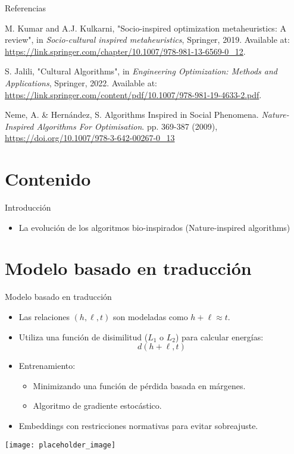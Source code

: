 \documentclass{beamer}
\begin{document}
\begin{frame}{Referencias}
\begin{thebibliography}{30}

M. Kumar and A.J. Kulkarni,
"Socio-inspired optimization metaheuristics: A review",
in \textit{Socio-cultural inspired metaheuristics}, Springer, 2019.
Available at: \url{https://link.springer.com/chapter/10.1007/978-981-13-6569-0_12}.

S. Jalili,
"Cultural Algorithms",
in \textit{Engineering Optimization: Methods and Applications}, Springer, 2022.
Available at: \url{https://link.springer.com/content/pdf/10.1007/978-981-19-4633-2.pdf}.

Neme, A. \& Hernández, S. Algorithms Inspired in Social Phenomena. {\em Nature-Inspired Algorithms For Optimisation}. pp. 369-387 (2009),  \url{https://doi.org/10.1007/978-3-642-00267-0_13}

\end{thebibliography}
\end{frame}


\section{Contenido}
\begin{frame}{Introducción}
    \begin{itemize}
        \item La evolución de los algoritmos bio-inspirados (Nature-inspired algorithms)
    \end{itemize}
\end{frame}


\section{Modelo basado en traducción}

\begin{frame}{Modelo basado en traducción}
    \begin{itemize}
        \item Las relaciones $(h, \ell, t)$ son modeladas como $h + \ell \approx t$.
        \item Utiliza una función de disimilitud ($L_1$ o $L_2$) para calcular energías:
        \[
        d(h + \ell, t)
        \]
        \item Entrenamiento:
        \begin{itemize}
            \item Minimizando una función de pérdida basada en márgenes.
            \item Algoritmo de gradiente estocástico.
        \end{itemize}
        \item Embeddings con restricciones normativas para evitar sobreajuste.
    \end{itemize}
    \vspace{0.5cm}
    \centering
    \texttt{[image: placeholder\_image]} %
\end{frame}
\end{document}
